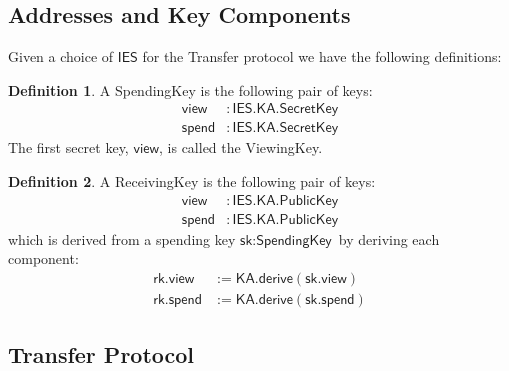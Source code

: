 \documentclass[a4paper]{article}
\newcommand{\lsubsection}[2]{\def\sectionlabel{#2} \subsection{#1}\label{sec:#2}}
\theoremstyle{definition}
\newtheorem{definition}{Definition}[subsection]
\newcommand{\IES}{{\textsf{IES}}}
\newcommand{\KA}{{\textsf{KA}}}
\newcommand{\PublicKey}{{\textsf{PublicKey}}}
\newcommand{\ReceivingKey}{{\textsf{ReceivingKey}}}
\newcommand{\SecretKey}{{\textsf{SecretKey}}}
\newcommand{\SpendingKey}{{\textsf{SpendingKey}}}
\newcommand{\Transfer}{{\textsf{Transfer}}}
\newcommand{\ViewingKey}{{\textsf{ViewingKey}}}
\newcommand{\derive}{{\textsf{derive}}}
\newcommand{\rk}{{\textsf{rk}}}
\newcommand{\sk}{{\textsf{sk}}}
\newcommand{\spend}{{\textsf{spend}}}
\newcommand{\view}{{\textsf{view}}}
\begin{document}
\lsubsection{Addresses and Key Components}{addresses-and-key-components}

Given a choice of $\IES$ for the \Transfer{} protocol we have the following definitions:

\begin{definition}
    A \SpendingKey{} is the following pair of keys:
    \begin{align*}
        \view  &: \IES.\KA.\SecretKey \\
        \spend &: \IES.\KA.\SecretKey
    \end{align*}
    The first secret key, $\view$, is called the \ViewingKey{}.
\end{definition}

\begin{definition}
    A \ReceivingKey{} is the following pair of keys:
    \begin{align*}
        \view  &: \IES.\KA.\PublicKey \\
        \spend &: \IES.\KA.\PublicKey
    \end{align*}
    which is derived from a spending key $\sk : \SpendingKey$ by deriving each component:
    \begin{align*}
        \rk.\view &:= \KA.\derive(\sk.\view) \\
        \rk.\spend   &:= \KA.\derive(\sk.\spend)
    \end{align*}
\end{definition}

\lsubsection{\Transfer{} Protocol}{transfer-protocol}
\end{document}
